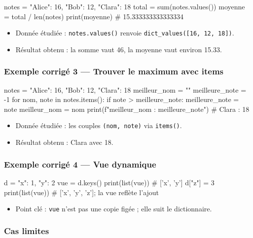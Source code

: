 \begin{python}
notes = {"Alice": 16, "Bob": 12, "Clara": 18}
total = sum(notes.values())
moyenne = total / len(notes)
print(moyenne)  # 15.333333333333334
\end{python}

\begin{itemize}
\tightlist
\item
  Donnée étudiée : \texttt{notes.values()} renvoie
  \texttt{dict\_values({[}16,\ 12,\ 18{]})}.
\item
  Résultat obtenu : la somme vaut 46, la moyenne vaut environ 15.33.
\end{itemize}

\subsubsection{Exemple corrigé 3 — Trouver le maximum avec items}

\begin{python}
notes = {"Alice": 16, "Bob": 12, "Clara": 18}
meilleur_nom = ""
meilleure_note = -1
for nom, note in notes.items():
    if note > meilleure_note:
        meilleure_note = note
        meilleur_nom = nom
print(f"{meilleur_nom} : {meilleure_note}")  # Clara : 18
\end{python}

\begin{itemize}
\tightlist
\item
  Donnée étudiée : les couples \texttt{(nom,\ note)} via
  \texttt{items()}.
\item
  Résultat obtenu : Clara avec 18.
\end{itemize}

\subsubsection{Exemple corrigé 4 — Vue dynamique}

\begin{python}
d = {"x": 1, "y": 2}
vue = d.keys()
print(list(vue))  # ['x', 'y']
d["z"] = 3
print(list(vue))  # ['x', 'y', 'z']; la vue reflète l'ajout
\end{python}

\begin{itemize}
\tightlist
\item
  Point clé : \texttt{vue} n'est pas une copie figée ; elle suit le
  dictionnaire.
\end{itemize}

\subsubsection{Cas limites}

